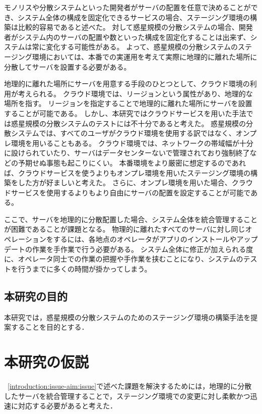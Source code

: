 モノリスや分散システムといった開発者がサーバの配置を任意で決めることができ、システム全体の構成を固定化できるサービスの場合、ステージング環境の構築は比較的容易であると述べた。
対して惑星規模の分散システムの場合、開発者がシステム内のサーバの配置や数といった構成を固定化することは出来ず、システムは常に変化する可能性がある。
よって、惑星規模の分散システムのステージング環境においては、本番での実運用を考えて実際に地理的に離れた場所に分散してサーバを設置する必要がある。

地理的に離れた場所にサーバを用意する手段のひとつとして、クラウド環境の利用が考えられる。
クラウド環境では、リージョンという属性があり、地理的な場所を指す。
リージョンを指定することで地理的に離れた場所にサーバを設置することが可能である。
しかし、本研究ではクラウドサービスを用いた手法では惑星規模の分散システムのテストには不十分であると考えた。
惑星規模の分散システムでは、すべてのユーザがクラウド環境を使用する訳ではなく、オンプレ環境を用いることもある。
クラウド環境では、ネットワークの帯域幅が十分に設けられていたり、サーバはデータセンターないで管理されており強制終了などの予期せぬ事態も起こりにくい。
本番環境をより厳密に想定するのであれば、クラウドサービスを使うよりもオンプレ環境を用いたステージング環境の構築をした方が好ましいと考えた。
さらに、オンプレ環境を用いた場合、クラウドサービスを使用するよりもより自由にサーバの配置を設定することが可能である。

ここで、サーバを地理的に分散配置した場合、システム全体を統合管理することが困難であることが課題となる。
物理的に離れたすべてのサーバに対し同じオペレーションをするには、各地点のオペレータがアプリのインストールやアップデートの作業を手作業で行う必要がある。
システム全体に修正が加えられる度に、オペレータ同士での作業の把握や手作業を挟むことになり、システムのテストを行うまでに多くの時間が掛かってしまう。

\subsection{本研究の目的}
\label{introduction:issue-aim:aim}

本研究では，惑星規模の分散システムのためのステージング環境の構築手法を提案することを目的とする．

\section{本研究の仮説}
\label{introduction:hypothesis}

~\ref{introduction:issue-aim:issue}で述べた課題を解決するためには，地理的に分散したサーバを統合管理することで，ステージング環境での変更に対し柔軟かつ迅速に対応する必要があると考えた．

